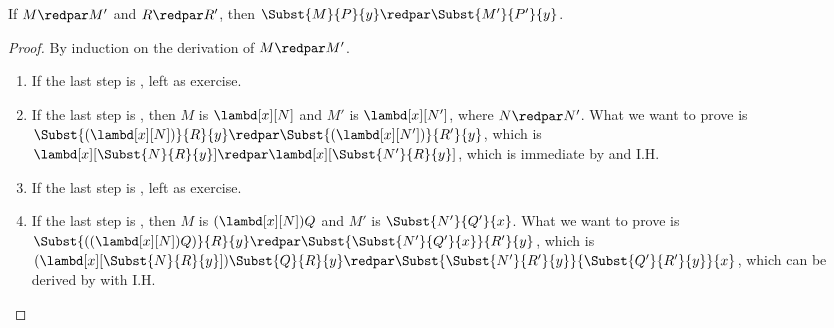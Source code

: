 \documentclass[../../../include/open-logic-section]{subfiles}
\begin{document}
\begin{lem}
  If $M \redpar M'$ and $R \redpar R'$, then $\Subst{M}{P}{y}
  \redpar \Subst{M'}{P'}{y}$.
\end{lem}
\begin{proof}
  By induction on the derivation of $M \redpar M'$.
  \begin{enumerate}
    \item If the last step is , left as exercise.
    \item If the last step is , then $M$ is 
      $\lambd[x][N]$ and $M'$ is $\lambd[x][N']$,
      where $N \redpar N'$. What we want to prove is
      $\Subst{(\lambd[x][N])}{R}{y} \redpar
      \Subst{(\lambd[x][N'])}{R'}{y}$, which is
      $\lambd[x][\Subst{N}{R}{y}] \redpar
      \lambd[x][\Subst{N'}{R}{y}]$, which is immediate by
       and I.H.
    \item If the last step is , left as exercise.
    \item If the last step is , then $M$ is
      $(\lambd[x][N])Q$ and $M'$ is $\Subst{N'}{Q'}{x}$. What
      we want to prove is $\Subst{((\lambd[x][N])Q)}{R}{y}
      \redpar \Subst{\Subst{N'}{Q'}{x}}{R'}{y}$, which is
      $(\lambd[x][\Subst{N}{R}{y}])\Subst{Q}{R}{y} \redpar
      \Subst{\Subst{N'}{R'}{y}}{\Subst{Q'}{R'}{y}}{x}$, which
      can be derived by  with I.H.
  \end{enumerate}
\end{proof}
\end{document}
